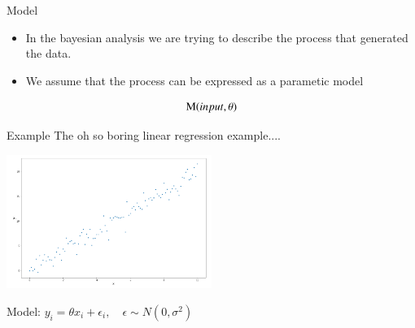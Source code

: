 \documentclass[12pt, aspectratio=149]{beamer}
\theoremstyle{plain}
\begin{document}
\begin{frame}[fragile]{Model}
\begin{itemize}
\item In the bayesian analysis we are trying to describe the process that generated the data. 
\item We assume that the process can be expressed as a parametic model
\end{itemize}
\begin{equation*}
\text{\text{M}}(input, \theta)
\end{equation*}
\end{frame}

\begin{frame}[fragile]{Example}
The oh so boring linear regression example....
\begin{center}
\includegraphics[width=0.5\textwidth]{figs/linreg_example.png}
\end{center}
Model:  \quad \quad  $ y_i = \theta  x_i + \epsilon_i, \quad \epsilon \sim N(0, \sigma^2)$
\end{frame}
\end{document}
